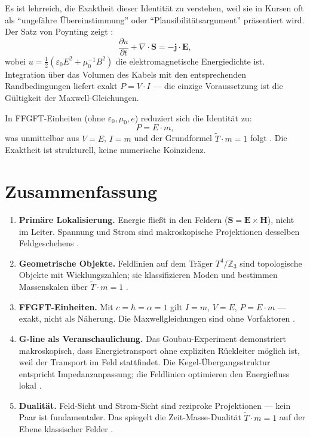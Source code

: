 Es ist lehrreich, die Exaktheit dieser Identität zu verstehen, weil sie in
Kursen oft als ``ungefähre Übereinstimmung'' oder ``Plausibilitätsargument''
präsentiert wird. Der Satz von Poynting zeigt \EM:
\[
  \frac{\partial u}{\partial t} + \nabla \cdot \mathbf{S} = -\mathbf{j}\cdot\mathbf{E},
\]
wobei $u = \frac{1}{2}(\varepsilon_0 E^2 + \mu_0^{-1}B^2)$ die
elektromagnetische Energiedichte ist. Integration über das Volumen des
Kabels mit den entsprechenden Randbedingungen liefert exakt $P = V \cdot I$
--- die einzige Voraussetzung ist die Gültigkeit der Maxwell-Gleichungen.

In FFGFT-Einheiten (ohne $\varepsilon_0, \mu_0, e$) reduziert sich die
Identität zu:
\[
  P = E \cdot m,
\]
was unmittelbar aus $V = E$, $I = m$ und der Grundformel $\tilde{T}\cdot m=1$
folgt \KM. Die Exaktheit ist strukturell, keine numerische Koinzidenz.

\section{Zusammenfassung}

\begin{enumerate}[nosep]
\item \textbf{Primäre Lokalisierung.} Energie fließt in den Feldern
  ($\mathbf{S} = \mathbf{E}\times\mathbf{H}$), nicht im Leiter.
  Spannung und Strom sind makroskopische Projektionen desselben
  Feldgeschehens \EM.

\item \textbf{Geometrische Objekte.} Feldlinien auf dem Träger
  $T^4/\mathbb{Z}_3$ sind topologische Objekte mit Wicklungszahlen;
  sie klassifizieren Moden und bestimmen Massenskalen über
  $\tilde{T}\cdot m=1$ \BM.

\item \textbf{FFGFT-Einheiten.} Mit $c=\hbar=\alpha=1$ gilt $I=m$,
  $V=E$, $P=E\cdot m$ --- exakt, nicht als Näherung.
  Die Maxwellgleichungen sind ohne Vorfaktoren \KM.

\item \textbf{G-line als Veranschaulichung.} Das Goubau-Experiment
  demonstriert makroskopisch, dass Energietransport ohne expliziten
  Rückleiter möglich ist, weil der Transport im Feld stattfindet.
  Die Kegel-Übergangsstruktur entspricht Impedanzanpassung;
  die Feldlinien optimieren den Energiefluss lokal \EM.

\item \textbf{Dualität.} Feld-Sicht und Strom-Sicht sind reziproke
  Projektionen --- kein Paar ist fundamentaler. Das spiegelt die
  Zeit-Masse-Dualität $\tilde{T}\cdot m=1$ auf der Ebene klassischer
  Felder \SM.
\end{enumerate}

